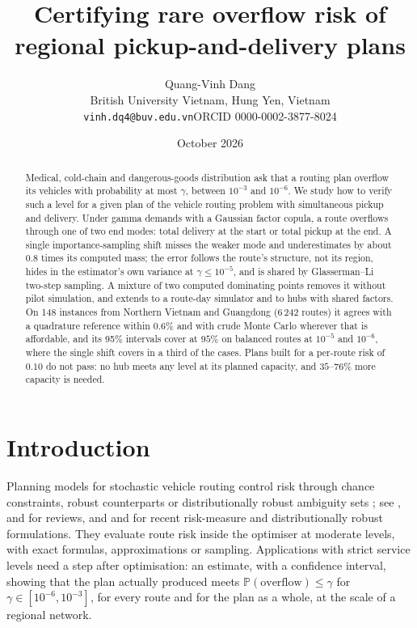 \documentclass[11pt]{article}
\title{Certifying rare overflow risk of regional pickup-and-delivery plans}
\author{Quang-Vinh Dang\\
British University Vietnam, Hung Yen, Vietnam\\
\texttt{vinh.dq4@buv.edu.vn}\quad ORCID 0000-0002-3877-8024}
\date{October 2026}
\theoremstyle{definition}
\theoremstyle{remark}
\renewcommand{\P}{\mathbb{P}}
\begin{document}
\maketitle

\begin{abstract}
Medical, cold-chain and dangerous-goods distribution ask that a routing plan
overflow its vehicles with probability at most $\gamma$, between $10^{-3}$ and
$10^{-6}$. We study how to verify such a level for a given plan of the vehicle
routing problem with simultaneous pickup and delivery. Under gamma demands with
a Gaussian factor copula, a route overflows through one of two end modes: total
delivery at the start or total pickup at the end. A single importance-sampling
shift misses the weaker mode and underestimates by about $0.8$ times its
computed mass; the error follows the route's structure, not its region, hides
in the estimator's own variance at $\gamma\le10^{-5}$, and is shared by
Glasserman--Li two-step sampling. A mixture of two computed dominating points
removes it without pilot simulation, and extends to a route-day simulator and to
hubs with shared factors. On 148 instances from Northern Vietnam and Guangdong
(6\,242 routes) it agrees with a quadrature reference within $0.6\%$ and with
crude Monte Carlo wherever that is affordable, and its 95\% intervals cover at
$95\%$ on balanced routes at $10^{-5}$ and $10^{-6}$, where the single shift
covers in a third of the cases. Plans built for a per-route risk of $0.10$ do
not pass: no hub meets any level at its planned capacity, and $35$--$76\%$
more capacity is needed.
\end{abstract}

\section{Introduction}

Planning models for stochastic vehicle routing control risk through chance
constraints, robust counterparts or distributionally robust ambiguity sets
\citep{GounarisWiesemannFloudas2013,DinhFukasawaLuedtke2018,GhosalWiesemann2020};
see \citet{GendreauJabaliRei2016}, \citet{akhmetbek2024stochastic} and \citet{karimi2026stochastic} for reviews,
and \citet{Ghosal2024Unifying} and \citet{wang2023distributionally,yin2022distributionally} for recent
risk-measure and distributionally robust formulations. They evaluate route risk inside
the optimiser at moderate levels, with exact formulas, approximations or
sampling. Applications with strict service levels need a step after
optimisation: an estimate, with a confidence interval, showing that the plan
actually produced meets $\P(\text{overflow}) \le \gamma$ for
$\gamma \in [10^{-6}, 10^{-3}]$, for every route and for the plan as a whole,
at the scale of a regional network.
\end{document}
